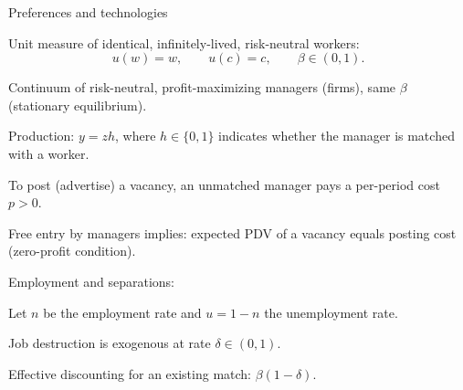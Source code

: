 \documentclass[aspectratio=169,xcolor=dvipsnames]{beamer}
\let\tempone\itemize
\let\temptwo\enditemize
\renewenvironment{itemize}{\tempone\addtolength{\itemsep}{\fill}}{\temptwo}
\begin{document}
\begin{frame}{Preferences and technologies}
\label{slide:MP_26_Primitives}
\small
\begin{itemize}
    \item Unit measure of identical, infinitely-lived, risk-neutral workers:
    \[
        u(w)=w,\qquad u(c)=c,\qquad \beta\in(0,1).
    \]
    \item Continuum of risk-neutral, profit-maximizing managers (firms), same \(\beta\) (stationary equilibrium).
    \item Production: \(y = z h\), where \(h\in\{0,1\}\) indicates whether the manager is matched with a worker.
    \item To post (advertise) a vacancy, an unmatched manager pays a per-period cost \(p>0\).
    \item Free entry by managers implies: expected PDV of a vacancy equals posting cost (zero-profit condition).
    \item Employment and separations:
    \begin{itemize}
        \item Let \(n\) be the employment rate and \(u=1-n\) the unemployment rate.
        \item Job destruction is exogenous at rate \(\delta\in(0,1)\).
        \item Effective discounting for an existing match: \(\beta(1-\delta)\).
    \end{itemize}
\end{itemize}
\end{frame}

\end{document}
